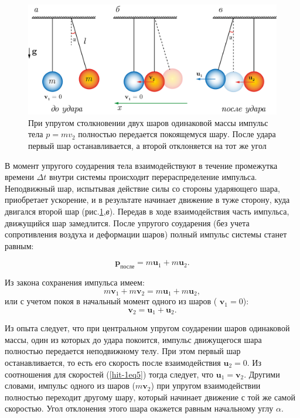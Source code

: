 \documentclass[All.tex]{subfiles}
\begin{document}
\begin{figure}[H]
	\centering 	
	\includegraphics[width=0.9\linewidth]{hit-4.png}
	\caption{При упругом столкновении двух шаров одинаковой массы импульс тела $ p=mv_2 $ полностью передается покоящемуся шару. После удара первый шар останавливается, а второй отклоняется на тот же угол}
	\label{hit-4}
\end{figure}

В момент упругого соударения тела взаимодействуют в течение промежутка времени $ \Delta t $ внутри системы происходит перераспределение импульса.
Неподвижный шар, испытывая действие силы со стороны ударяющего шара, приобретает ускорение, и в результате начинает движение в туже сторону, куда двигался второй шар (рис.\ref{hit-4},\textit{в}).
Передав в ходе взаимодействия часть импульса, движущийся шар замедлится.
После упругого соударения (без учета сопротивления воздуха и деформации шаров) полный импульс системы станет равным:

	\begin{equation}\label{hit-1eq3}
\textbf{p}_{\text{после}}  = m \textbf{u}_1 + m \textbf{u}_2.
\end{equation}

Из закона сохранения импульса имеем:
	\begin{equation}\label{hit-1eq4}
m \textbf{v}_1 + m \textbf{v}_2  = m \textbf{u}_1 + m \textbf{u}_2,
\end{equation}
или с учетом покоя в начальный момент одного из шаров ( $ \textbf{v}_1=0 $):
	\begin{equation}\label{hit-1eq5}
\textbf{v}_2  = \textbf{u}_1 + \textbf{u}_2.
\end{equation}

Из опыта следует, что при центральном упругом соударении шаров одинаковой массы, один из которых до удара покоится, импульс движущегося шара полностью передается неподвижному телу.
При этом первый шар останавливается, то есть его скорость после взаимодействия $ \textbf{u}_2=0 $.  
Из соотношения для скоростей (\ref{hit-1eq5}) тогда следует, что $ \textbf{u}_1  = \textbf{v}_2 $.
Другими словами, импульс одного из шаров ($ m\textbf{v}_2 $) при упругом взаимодействии полностью переходит другому шару, который начинает движение с той же самой скоростью.
Угол отклонения этого шара окажется равным начальному углу $ \alpha $.
\end{document}
